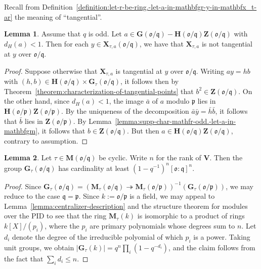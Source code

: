 \documentclass[reqno]{amsart}
\theoremstyle{plain} \newtheorem{theorem} {Theorem} \newtheorem{conjecture} {Conjecture} \newtheorem{corollary} [theorem] {Corollary} \newtheorem{proposition} [theorem] {Proposition} \newtheorem{fact} [theorem] {Fact}
\theoremstyle{definition} \newtheorem{definition} [theorem] {Definition}
\theoremstyle{itplain} %
\newtheorem{lemma}[theorem]{Lemma}
\newcommand{\mfq}{\mathfrak{q}}
\begin{document}
Recall from Definition~\ref{definition:let-r-be-ring.-let-a-in-mathbfgr-y-in-mathbfx_t-ar} the meaning of ``tangential''.
\begin{lemma}\label{lemma:supp-char-mathfr-odd.-let-a-in-mathbfgm-not-tangential}
  Assume that $q$ is odd.  Let $a \in \mathbf{G}(\mathfrak{o}/\mfq) - \mathbf{H}(\mathfrak{o}/\mfq) \mathbf{Z}(\mathfrak{o}/\mfq)$ with $d_H(a) < 1$.  Then for each $y \in \mathbf{X}_{\tau,a}(\mathfrak{o}/\mfq)$, we have that $\mathbf{X}_{\tau,a}$ is not tangential at $y$ over $\mathfrak{o}/\mfq$.
\end{lemma}
\begin{proof}
  Suppose otherwise that $\mathbf{X}_{\tau,a}$ is tangential at $y$ over $\mathfrak{o}/\mfq$. Writing $a y = h b$ with $(h,b) \in \mathbf{H}(\mathfrak{o}/\mfq) \times \mathbf{G}_\tau(\mathfrak{o}/\mfq)$, it follows then by Theorem~\ref{theorem:characterization-of-tangential-points} that $b^2 \in \mathbf{Z}(\mathfrak{o}/\mfq)$.  On the other hand, since $d_H(a) < 1$, the image $\bar{a}$ of $a$ modulo $\mathfrak{p}$ lies in $\mathbf{H}(\mathfrak{o}/\mathfrak{p}) \mathbf{Z}(\mathfrak{o}/\mathfrak{p})$. By the uniqueness of the decomposition $\bar{a} \bar{y} = \bar{h} \bar{b}$, it follows that $\bar{b}$ lies in $\mathbf{Z}(\mathfrak{o}/\mathfrak{p})$.  By Lemma~\ref{lemma:supp-char-mathfr-odd.-let-a-in-mathbfgm}, it follows that $b \in \mathbf{Z}(\mathfrak{o}/\mfq)$.  But then $a \in \mathbf{H}(\mathfrak{o}/\mfq) \mathbf{Z}(\mathfrak{o}/\mfq)$, contrary to assumption.
\end{proof}

\begin{lemma}\label{lemma:cardinality-centralizer}
  Let $\tau \in \mathbf{M}(\mathfrak{o}/\mfq)$ be cyclic.  Write $n$ for the rank of $\mathbf{V}$.  Then the group $\mathbf{G}_{\tau}(\mathfrak{o}/\mfq)$ has cardinality at least ${(1 - q^{-1})}^n {[\mathfrak{o}:\mfq]}^n$.
\end{lemma}
\begin{proof}
  Since $\mathbf{G}_\tau(\mathfrak{o}/\mfq) = {\left( \mathbf{M}_\tau(\mathfrak{o}/\mfq) \twoheadrightarrow \mathbf{M}_\tau(\mathfrak{o}/\mathfrak{p}) \right)}^{-1}(\mathbf{G}_\tau(\mathfrak{o}/\mathfrak{p}))$, we may reduce to the case $\mfq = \mathfrak{p}$.  Since $k := \mathfrak{o}/\mathfrak{p}$ is a field, we may appeal to Lemma~\ref{lemma:centralizer-description} and the structure theorem for modules over the PID to see that the ring $\mathbf{M}_\tau(k)$ is isomorphic to a product of rings $k[X]/(p_i)$, where the $p_i$ are primary polynomials whose degrees sum to $n$.  Let $d_i$ denote the degree of the irreducible polyomial of which $p_i$ is a power.  Taking unit groups, we obtain $\lvert \mathbf{G}_\tau(k) \rvert = q^n \prod_i (1 - q^{-d_i})$, and the claim follows from the fact that $\sum_i d_i \leq n$.
\end{proof}
\end{document}
